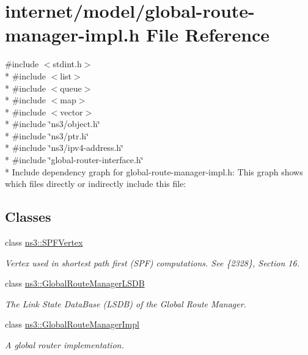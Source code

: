 \hypertarget{global-route-manager-impl_8h}{}\section{internet/model/global-\/route-\/manager-\/impl.h File Reference}
\label{global-route-manager-impl_8h}
{\ttfamily \#include $<$stdint.\+h$>$}\\*
{\ttfamily \#include $<$list$>$}\\*
{\ttfamily \#include $<$queue$>$}\\*
{\ttfamily \#include $<$map$>$}\\*
{\ttfamily \#include $<$vector$>$}\\*
{\ttfamily \#include \char`\"{}ns3/object.\+h\char`\"{}}\\*
{\ttfamily \#include \char`\"{}ns3/ptr.\+h\char`\"{}}\\*
{\ttfamily \#include \char`\"{}ns3/ipv4-\/address.\+h\char`\"{}}\\*
{\ttfamily \#include \char`\"{}global-\/router-\/interface.\+h\char`\"{}}\\*
Include dependency graph for global-\/route-\/manager-\/impl.h\+:
This graph shows which files directly or indirectly include this file\+:
\subsection*{Classes}
\begin{DoxyCompactItemize}
\item 
class \hyperlink{classns3_1_1SPFVertex}{ns3\+::\+S\+P\+F\+Vertex}
\begin{DoxyCompactList}\small\item\em Vertex used in shortest path first (S\+PF) computations. See \{2328\}, Section 16. \end{DoxyCompactList}\item 
class \hyperlink{classns3_1_1GlobalRouteManagerLSDB}{ns3\+::\+Global\+Route\+Manager\+L\+S\+DB}
\begin{DoxyCompactList}\small\item\em The Link State Data\+Base (L\+S\+DB) of the Global Route Manager. \end{DoxyCompactList}\item 
class \hyperlink{classns3_1_1GlobalRouteManagerImpl}{ns3\+::\+Global\+Route\+Manager\+Impl}
\begin{DoxyCompactList}\small\item\em A global router implementation. \end{DoxyCompactList}\end{DoxyCompactItemize}
